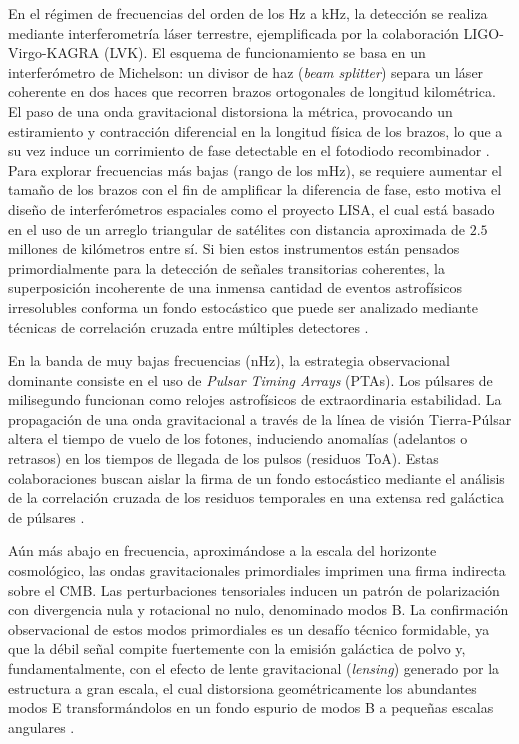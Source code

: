 En el régimen de frecuencias del orden de los Hz a kHz, la detección se realiza mediante interferometría láser terrestre, ejemplificada por la colaboración LIGO-Virgo-KAGRA (LVK). El esquema de funcionamiento se basa en un interferómetro de Michelson: un divisor de haz (\textit{beam splitter}) separa un láser coherente en dos haces que recorren brazos ortogonales de longitud kilométrica. El paso de una onda gravitacional distorsiona la métrica, provocando un estiramiento y contracción diferencial en la longitud física de los brazos, lo que a su vez induce un corrimiento de fase detectable en el fotodiodo recombinador \cite{Maggiore_2018, LIGO}. Para explorar frecuencias más bajas (rango de los mHz), se requiere aumentar el tamaño de los brazos con el fin de amplificar la diferencia de fase, esto motiva el diseño de interferómetros espaciales como el proyecto LISA, el cual está basado en el uso de un arreglo triangular de satélites con distancia aproximada de $2.5$ millones de kilómetros entre sí. Si bien estos instrumentos están pensados primordialmente para la detección de señales transitorias coherentes, la superposición incoherente de una inmensa cantidad de eventos astrofísicos irresolubles conforma un fondo estocástico que puede ser analizado mediante técnicas de correlación cruzada entre múltiples detectores \cite{Caprini_2020, Allen_1999}.

En la banda de muy bajas frecuencias (nHz), la estrategia observacional dominante consiste en el uso de \textit{Pulsar Timing Arrays} (PTAs). Los púlsares de milisegundo funcionan como relojes astrofísicos de extraordinaria estabilidad. La propagación de una onda gravitacional a través de la línea de visión Tierra-Púlsar altera el tiempo de vuelo de los fotones, induciendo anomalías (adelantos o retrasos) en los tiempos de llegada de los pulsos (residuos ToA). Estas colaboraciones buscan aislar la firma de un fondo estocástico mediante el análisis de la correlación cruzada de los residuos temporales en una extensa red galáctica de púlsares \cite{Renzini2022, NANOGrav}.

Aún más abajo en frecuencia, aproximándose a la escala del horizonte cosmológico, las ondas gravitacionales primordiales imprimen una firma indirecta sobre el CMB. Las perturbaciones tensoriales inducen un patrón de polarización con divergencia nula y rotacional no nulo, denominado modos B. La confirmación observacional de estos modos primordiales es un desafío técnico formidable, ya que la débil señal compite fuertemente con la emisión galáctica de polvo y, fundamentalmente, con el efecto de lente gravitacional (\textit{lensing}) generado por la estructura a gran escala, el cual distorsiona geométricamente los abundantes modos E transformándolos en un fondo espurio de modos B a pequeñas escalas angulares \cite{Baumann_2012, Planck}.

